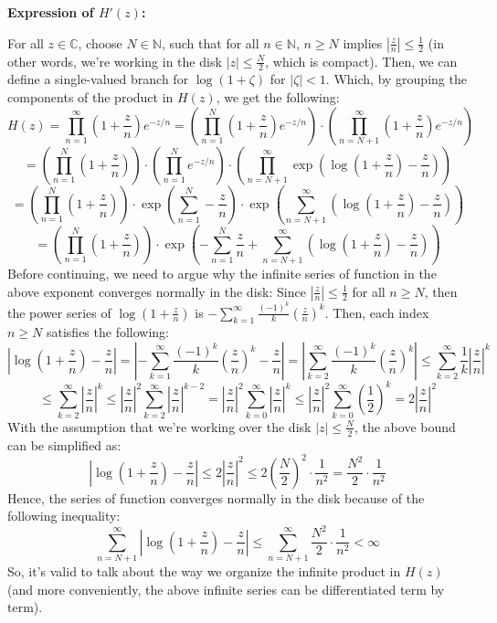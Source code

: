 \documentclass{article}
\begin{document}
\hfil

\textbf{Expression of $H'(z)$:}

For all $z\in\mathbb{C}$, choose $N\in\mathbb{N}$, such that for all $n\in\mathbb{N}$, $n\geq N$ implies $\left|\frac{z}{n}\right|\leq \frac{1}{2}$ (in other words, we're working in the disk $|z|\leq \frac{N}{2}$, which is compact). 
Then, we can define a single-valued branch for $\log(1+\zeta)$ for $|\zeta|<1$.
Which, by grouping the components of the product in $H(z)$, we get the following:
$$H(z)=\prod_{n=1}^{\infty}\left(1+\frac{z}{n}\right)e^{-z/n}=\left(\prod_{n=1}^{N}\left(1+\frac{z}{n}\right)e^{-z/n}\right)\cdot\left(\prod_{n=N+1}^{\infty}\left(1+\frac{z}{n}\right)e^{-z/n}\right)$$
$$=\left(\prod_{n=1}^{N}\left(1+\frac{z}{n}\right)\right)\cdot \left(\prod_{n=1}^{N}e^{-z/n}\right)\cdot\left(\prod_{n=N+1}^{\infty}\exp\left(\log\left(1+\frac{z}{n}\right)-\frac{z}{n}\right)\right)$$
$$=\left(\prod_{n=1}^{N}\left(1+\frac{z}{n}\right)\right)\cdot \exp\left(\sum_{n=1}^{N}-\frac{z}{n}\right)\cdot\exp\left(\sum_{n=N+1}^{\infty}\left(\log\left(1+\frac{z}{n}\right)-\frac{z}{n}\right)\right)$$
$$=\left(\prod_{n=1}^{N}\left(1+\frac{z}{n}\right)\right)\cdot\exp\left(-\sum_{n=1}^{N}\frac{z}{n}+\sum_{n=N+1}^{\infty}\left(\log\left(1+\frac{z}{n}\right)-\frac{z}{n}\right)\right)$$
Before continuing, we need to argue why the infinite series of function in the above exponent converges normally in the disk:
Since $\left|\frac{z}{n}\right|\leq \frac{1}{2}$ for all $n\geq N$, then the power series of $\log(1+\frac{z}{n})$ is $-\sum_{k=1}^{\infty}\frac{(-1)^k}{k}\left(\frac{z}{n}\right)^k$. Then, each index $n\geq N$ satisfies the following:
$$\left|\log\left(1+\frac{z}{n}\right)-\frac{z}{n}\right|=\left|-\sum_{k=1}^{\infty}\frac{(-1)^k}{k}\left(\frac{z}{n}\right)^k-\frac{z}{n}\right| = \left|\sum_{k=2}^{\infty}\frac{(-1)^k}{k}\left(\frac{z}{n}\right)^k\right| \leq \sum_{k=2}^{\infty}\frac{1}{k}\left|\frac{z}{n}\right|^k$$
$$\leq \sum_{k=2}^{\infty}\left|\frac{z}{n}\right|^k\leq \left|\frac{z}{n}\right|^2\sum_{k=2}^{\infty}\left|\frac{z}{n}\right|^{k-2} = \left|\frac{z}{n}\right|^2\sum_{k=0}^{\infty}\left|\frac{z}{n}\right|^k\leq \left|\frac{z}{n}\right|^2\sum_{k=0}^{\infty}\left(\frac{1}{2}\right)^k = 2\left|\frac{z}{n}\right|^2$$
With the assumption that we're working over the disk $|z|\leq \frac{N}{2}$, the above bound can be simplified as:
$$\left|\log\left(1+\frac{z}{n}\right)-\frac{z}{n}\right|\leq 2\left|\frac{z}{n}\right|^2 \leq 2\left(\frac{N}{2}\right)^2\cdot\frac{1}{n^2} = \frac{N^2}{2}\cdot\frac{1}{n^2}$$
Hence, the series of function converges normally in the disk because of the following inequality:
$$\sum_{n=N+1}^{\infty}\left|\log\left(1+\frac{z}{n}\right)-\frac{z}{n}\right|\leq \sum_{n=N+1}^{\infty}\frac{N^2}{2}\cdot\frac{1}{n^2}<\infty$$
So, it's valid to talk about the way we organize the infinite product in $H(z)$ (and more conveniently, the above infinite series can be differentiated term by term).
\end{document}
